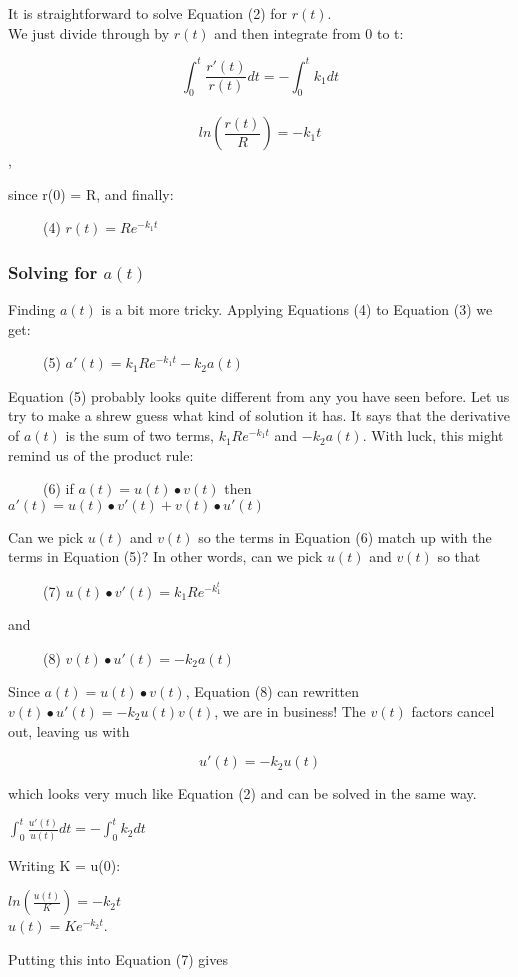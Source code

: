 \documentclass[]{article}
\begin{document}
It is straightforward to solve Equation (2) for \(r(t)\).\\
We just divide through by \(r(t)\) and then integrate from 0 to t:

\[\int_0^t \frac{r'(t)}{r(t)} dt= - \int_0^t k_1dt\]\\
\[ln(\frac{r(t)}{R}) = -k_1t\],

since r(0) = R, and finally:

~~~~~(4) \(r(t) = Re^{-k_1t}\)

\subsubsection{\texorpdfstring{Solving for
\(a(t)\)}{Solving for a(t)}}\label{solving-for-at}

Finding \(a(t)\) is a bit more tricky. Applying Equations (4) to
Equation (3) we get:

~~~~~(5) \(a'(t) = k_1Re^{-k_1t}-k_2a(t)\)

Equation (5) probably looks quite different from any you have seen
before. Let us try to make a shrew guess what kind of solution it has.
It says that the derivative of \(a(t)\) is the sum of two terms,
\(k_1Re^{-k_1t}\) and \(-k_2a(t)\). With luck, this might remind us of
the product rule:

~~~~~(6) if \(a(t) = u(t) \bullet v(t)\) then
\(a'(t) = u(t) \bullet v'(t) + v(t) \bullet u'(t)\)

Can we pick \(u(t)\) and \(v(t)\) so the terms in Equation (6) match up
with the terms in Equation (5)? In other words, can we pick \(u(t)\) and
\(v(t)\) so that

~~~~~(7) \(u(t) \bullet v'(t) = k_1Re^{-k_1^t}\)

and

~~~~~(8) \(v(t) \bullet u'(t) = -k_2a(t)\)

Since \(a(t) = u(t) \bullet v(t)\), Equation (8) can rewritten
\(v(t) \bullet u'(t) = -k_2u(t)v(t)\), we are in business! The \(v(t)\)
factors cancel out, leaving us with

\[u'(t) = -k_2u(t)\]

which looks very much like Equation (2) and can be solved in the same
way.

\(\int_0^t \frac{u'(t)}{u(t)} dt = -\int_0^t k_2dt\)

Writing K = u(0):

\(ln (\frac{u(t)}{K}) = -k_2t\)\\
\(u(t) = Ke^{-k_2t}\).

Putting this into Equation (7) gives
\end{document}
